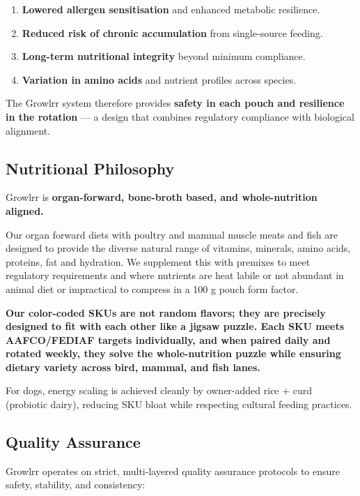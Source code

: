 \begin{enumerate}[leftmargin=1.5em]
\item \textbf{Lowered allergen sensitisation} and enhanced metabolic resilience.
\item \textbf{Reduced risk of chronic accumulation} from single-source feeding.
\item \textbf{Long-term nutritional integrity} beyond minimum compliance.
\item \textbf{Variation in amino acids} and nutrient profiles across species.
\end{enumerate}

The Growlrr system therefore provides \textbf{safety in each pouch and resilience in the rotation} --- a design that combines regulatory compliance with biological alignment.

\subsection*{Nutritional Philosophy}

Growlrr is \textbf{organ-forward, bone-broth based, and whole-nutrition aligned.}

Our organ forward diets with poultry and mammal muscle meats and fish are designed to provide the diverse natural range of vitamins, minerals, amino acids, proteins, fat and hydration. We supplement this with premixes to meet regulatory requirements and where nutrients are heat labile or not abundant in animal diet or impractical to compress in a 100 g pouch form factor.

\textbf{Our color-coded SKUs are not random flavors; they are precisely designed to fit with each other like a jigsaw puzzle. Each SKU meets AAFCO/FEDIAF targets individually, and when paired daily and rotated weekly, they solve the whole-nutrition puzzle while ensuring dietary variety across bird, mammal, and fish lanes.}

For dogs, energy scaling is achieved cleanly by owner-added rice + curd (probiotic dairy), reducing SKU bloat while respecting cultural feeding practices.

\subsection*{Quality Assurance}

Growlrr operates on strict, multi-layered quality assurance protocols to ensure safety, stability, and consistency:


